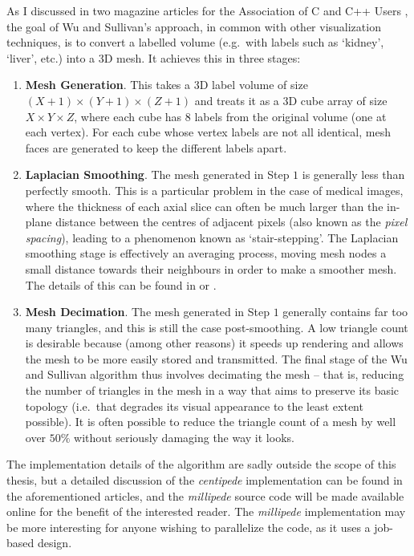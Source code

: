 As I discussed in two magazine articles for the Association of C and C++ Users \cite{golodetz08vis1,golodetz08vis2}, the goal of Wu and Sullivan's approach, in common with other visualization techniques, is to convert a labelled volume (e.g.~with labels such as `kidney', `liver', etc.) into a 3D mesh. It achieves this in three stages:
%
\begin{enumerate}

\item \textbf{Mesh Generation}. This takes a 3D label volume of size $(X+1) \times (Y+1) \times (Z+1)$ and treats it as a 3D cube array of size $X \times Y \times Z$, where each cube has $8$ labels from the original volume (one at each vertex). For each cube whose vertex labels are not all identical, mesh faces are generated to keep the different labels apart.
\item \textbf{Laplacian Smoothing}. The mesh generated in Step $1$ is generally less than perfectly smooth. This is a particular problem in the case of medical images, where the thickness of each axial slice can often be much larger than the in-plane distance between the centres of adjacent pixels (also known as the \emph{pixel spacing}), leading to a phenomenon known as `stair-stepping'. The Laplacian smoothing stage is effectively an averaging process, moving mesh nodes a small distance towards their neighbours in order to make a smoother mesh. The details of this can be found in \cite{wu03} or \cite{golodetz08vis2}.
\item \textbf{Mesh Decimation}. The mesh generated in Step $1$ generally contains far too many triangles, and this is still the case post-smoothing. A low triangle count is desirable because (among other reasons) it speeds up rendering and allows the mesh to be more easily stored and transmitted. The final stage of the Wu and Sullivan algorithm thus involves decimating the mesh -- that is, reducing the number of triangles in the mesh in a way that aims to preserve its basic topology (i.e.~that degrades its visual appearance to the least extent possible). It is often possible to reduce the triangle count of a mesh by well over $50\%$ without seriously damaging the way it looks.

\end{enumerate}
%
The implementation details of the algorithm are sadly outside the scope of this thesis, but a detailed discussion of the \emph{centipede} implementation can be found in the aforementioned articles, and the \emph{millipede} source code will be made available online for the benefit of the interested reader. The \emph{millipede} implementation may be more interesting for anyone wishing to parallelize the code, as it uses a job-based design.

